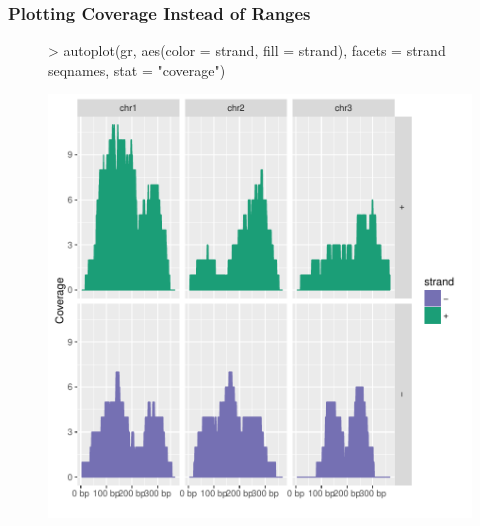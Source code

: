 \documentclass{beamer}
\begin{document}
\begin{frame}[containsverbatim]  
	\frametitle{Plotting Coverage Instead of Ranges}
\tiny 
\begin{figure}
  \centering
\begin{Schunk}
\begin{Sinput}
> autoplot(gr, aes(color = strand, fill = strand), facets = strand ~ seqnames, stat = "coverage")
\end{Sinput}
\end{Schunk}
\includegraphics{fig--081}
\label{fig:tracks}
\end{figure}
\end{frame}
\end{document}
